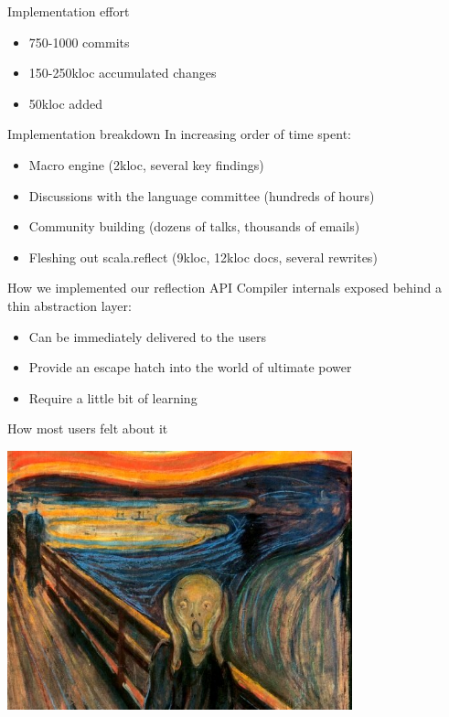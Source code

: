 \documentclass[svgnames,dvipsnames,hyperref={bookmarks=false},usepdftitle=false]{beamer}
\begin{document}

\begin{frame}{Implementation effort}
\begin{itemize}
\item 750-1000 commits
\item 150-250kloc accumulated changes
\item 50kloc added
\end{itemize}
\end{frame}

\begin{frame}{Implementation breakdown}
In increasing order of time spent:
\begin{itemize}
\item<1-> Macro engine (2kloc, several key findings)
\item<2-> Discussions with the language committee (hundreds of hours)
\item<3-> Community building (dozens of talks, thousands of emails)
\item<4-> \alert{Fleshing out scala.reflect (9kloc, 12kloc docs, several rewrites)}
\end{itemize}
\end{frame}


\begin{frame}{How we implemented our reflection API}
Compiler internals exposed behind a thin abstraction layer:
\begin{itemize}
\item Can be immediately delivered to the users
\item Provide an escape hatch into the world of ultimate power
\item Require a little bit of learning
\end{itemize}
\end{frame}

\begin{frame}{How most users felt about it}
\vskip15pt
\begin{center}
\includegraphics[height=7.5cm]{scream.jpg}
\end{center}
\end{frame}
\end{document}
